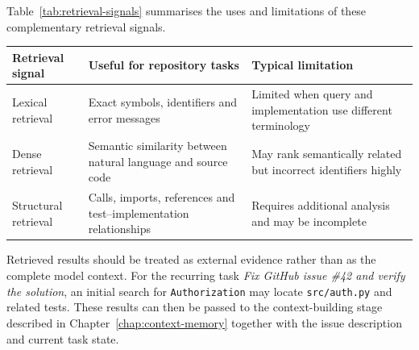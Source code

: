 \noindent\begin{minipage}{\linewidth}
Table~\ref{tab:retrieval-signals} summarises the uses and limitations of these complementary retrieval signals.\par\vspace{5pt}
\captionsetup{hypcap=false}
\label{tab:retrieval-signals}
\small\singlespacing
\renewcommand{\arraystretch}{1.15}
\begin{tabular}{@{}p{2.7cm}p{6.0cm}p{6.8cm}@{}}
\toprule
{\raggedright\textbf{Retrieval signal}\par} & {\raggedright\textbf{Useful for repository tasks}\par} & {\raggedright\textbf{Typical limitation}\par} \\
\midrule
{\raggedright Lexical retrieval\par} & {\raggedright Exact symbols, identifiers and error messages\par} & {\raggedright Limited when query and implementation use different terminology\par} \\
{\raggedright Dense retrieval\par} & {\raggedright Semantic similarity between natural language and source code\par} & {\raggedright May rank semantically related but incorrect identifiers highly\par} \\
{\raggedright Structural retrieval\par} & {\raggedright Calls, imports, references and test–implementation relationships\par} & {\raggedright Requires additional analysis and may be incomplete\par} \\
\bottomrule
\end{tabular}
\end{minipage}

Retrieved results should be treated as external evidence rather than as the complete model context. For the recurring task \emph{Fix GitHub issue \#42 and verify the solution}, an initial search for \texttt{Authorization} may locate \texttt{src/auth.py} and related tests. These results can then be passed to the context-building stage described in Chapter~\ref{chap:context-memory} together with the issue description and current task state.

